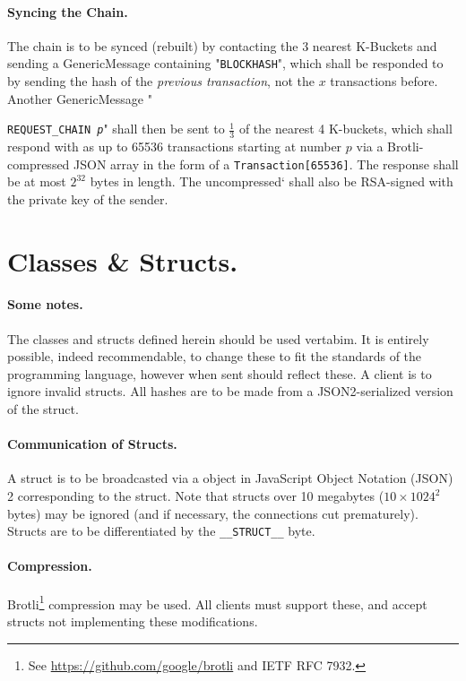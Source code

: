 \documentclass{article}
\begin{document}
\paragraph{Syncing the Chain.} The chain is to be synced (rebuilt) by
contacting the 3 nearest K-Buckets and sending a GenericMessage containing
"{\texttt{BLOCKHASH}}", which shall be responded to by sending the hash of the
{\it{previous transaction}}, not the $x$ transactions before. Another
GenericMessage "{\texttt{REQUEST\_CHAIN {\it{p}}}" shall then be sent to
$\frac{1}{3}$ of the nearest 4 K-buckets, which shall respond with as up to
65536 transactions starting at number $p$ via a Brotli-compressed JSON array in
the form of a \verb|Transaction[65536]|. The response shall be at most
$2^{32}$ bytes in length. The uncompressed` shall also be RSA-signed with the
private key of the sender.

\section{Classes \& Structs.}
\paragraph{Some notes.} The classes and structs defined herein should be used
vertabim. It is entirely possible, indeed recommendable, to change these to fit
the standards of the programming language, however when sent should reflect
these. A client is to ignore invalid structs. All hashes are to be made from
a JSON2-serialized version of the struct.

\paragraph{Communication of Structs.} A struct is to be broadcasted via a
object in JavaScript Object Notation (JSON) 2 corresponding to the struct.
Note that structs over 10 megabytes ($10 \times 1024^2$ bytes) may be ignored
(and if necessary, the connections cut prematurely). Structs are to be
differentiated by the \verb|__STRUCT__|  byte.

\paragraph{Compression.} Brotli\footnote{See
\url{https://github.com/google/brotli} and IETF RFC 7932.} compression may be
used. All clients must support these, and accept structs not implementing these
modifications.

}
\end{document}
